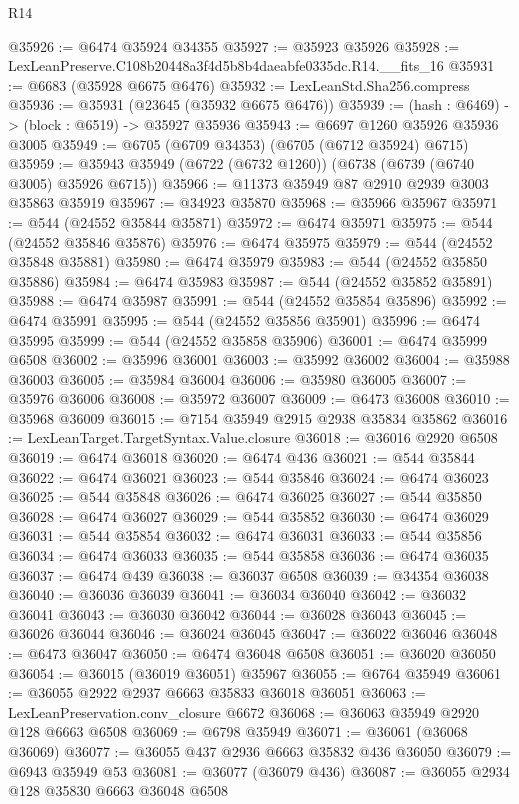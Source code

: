 \begin{lexlean}{R14}
\begin{coremodule}
@35926 := @6474 @35924 @34355
@35927 := @35923 @35926
@35928 := LexLeanPreserve.C108b20448a3f4d5b8b4daeabfe0335dc.R14.__fits_16
@35931 := @6683 (@35928 @6675 @6476)
@35932 := LexLeanStd.Sha256.compress
@35936 := @35931 (@23645 (@35932 @6675 @6476))
@35939 := (hash : @6469) -> (block : @6519) -> @35927 @35936
@35943 := @6697 @1260 @35926 @35936 @3005
@35949 := @6705 (@6709 @34353) (@6705 (@6712 @35924) @6715)
@35959 := @35943 @35949 (@6722 (@6732 @1260)) (@6738 (@6739 (@6740 @3005) @35926 @6715))
@35966 := @11373 @35949 @87 @2910 @2939 @3003 @35863 @35919
@35967 := @34923 @35870
@35968 := @35966 @35967
@35971 := @544 (@24552 @35844 @35871)
@35972 := @6474 @35971
@35975 := @544 (@24552 @35846 @35876)
@35976 := @6474 @35975
@35979 := @544 (@24552 @35848 @35881)
@35980 := @6474 @35979
@35983 := @544 (@24552 @35850 @35886)
@35984 := @6474 @35983
@35987 := @544 (@24552 @35852 @35891)
@35988 := @6474 @35987
@35991 := @544 (@24552 @35854 @35896)
@35992 := @6474 @35991
@35995 := @544 (@24552 @35856 @35901)
@35996 := @6474 @35995
@35999 := @544 (@24552 @35858 @35906)
@36001 := @6474 @35999 @6508
@36002 := @35996 @36001
@36003 := @35992 @36002
@36004 := @35988 @36003
@36005 := @35984 @36004
@36006 := @35980 @36005
@36007 := @35976 @36006
@36008 := @35972 @36007
@36009 := @6473 @36008
@36010 := @35968 @36009
@36015 := @7154 @35949 @2915 @2938 @35834 @35862
@36016 := LexLeanTarget.TargetSyntax.Value.closure
@36018 := @36016 @2920 @6508
@36019 := @6474 @36018
@36020 := @6474 @436
@36021 := @544 @35844
@36022 := @6474 @36021
@36023 := @544 @35846
@36024 := @6474 @36023
@36025 := @544 @35848
@36026 := @6474 @36025
@36027 := @544 @35850
@36028 := @6474 @36027
@36029 := @544 @35852
@36030 := @6474 @36029
@36031 := @544 @35854
@36032 := @6474 @36031
@36033 := @544 @35856
@36034 := @6474 @36033
@36035 := @544 @35858
@36036 := @6474 @36035
@36037 := @6474 @439
@36038 := @36037 @6508
@36039 := @34354 @36038
@36040 := @36036 @36039
@36041 := @36034 @36040
@36042 := @36032 @36041
@36043 := @36030 @36042
@36044 := @36028 @36043
@36045 := @36026 @36044
@36046 := @36024 @36045
@36047 := @36022 @36046
@36048 := @6473 @36047
@36050 := @6474 @36048 @6508
@36051 := @36020 @36050
@36054 := @36015 (@36019 @36051) @35967
@36055 := @6764 @35949
@36061 := @36055 @2922 @2937 @6663 @35833 @36018 @36051
@36063 := LexLeanPreservation.conv_closure @6672
@36068 := @36063 @35949 @2920 @128 @6663 @6508
@36069 := @6798 @35949
@36071 := @36061 (@36068 @36069)
@36077 := @36055 @437 @2936 @6663 @35832 @436 @36050
@36079 := @6943 @35949 @53
@36081 := @36077 (@36079 @436)
@36087 := @36055 @2934 @128 @35830 @6663 @36048 @6508

\end{coremodule}
\end{lexlean}
